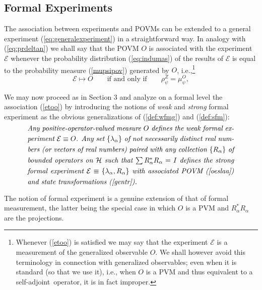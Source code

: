 \documentclass[12pt]{article}
\newcommand{\eq}[1]{(\ref{#1})}
\newcommand{\sa}{self-adjoint}
\renewcommand{\dagger}{\ast}
\newcommand{\id}{I}
\renewcommand{\a}{\alpha}
\newcommand{\la}{\lambda_{\a}}
\renewcommand{\H}{\mbox{$\mathcal{H}$}}
\newcommand{\Aa}{R_{\a}}
\newcommand{\Aad}{R^{\dagger}_{\a}}
\newcommand{\E}{\mbox{$\mathscr{E}$}}
\newcommand{\Ex}{\mbox{$\mathcal{E}$}}
\begin{document}
\subsection{Formal Experiments}\label{secFE}\label{subsec.comfefm}
The association between experiments and POVMs can be extended to a
general experiment (\ref{eq:generalexperiment}) in a straightforward
way.  In analogy with (\ref{eq:prdeltan}) we shall say that the POVM
$O$ is associated with the experiment \E{} whenever the probability
distribution (\ref{eq:indumas}) of the results of \E{} is equal to the
probability measure (\ref{mupsipov}) generated by $O$,
i.e.,\footnote{Whenever (\ref{etoo}) is satisfied we may say that the
   experiment \E{} is a measurement of the generalized observable $O$.
   We shall however avoid this terminology in connection with
   generalized observables; even when it is standard (so that we use
   it), i.e., when $ O$ is a PVM and thus equivalent to a \sa\
   operator, it is in fact improper.}
%
\begin{equation}
\E\mapsto O \qquad\mbox{if and only if}\qquad \rho^{ Z}_{\psi}
=\mu^O_\psi,
\label{etoo}
\end{equation}
%

We may now proceed as in Section 3 and analyze on a formal level the
association (\ref{etoo}) by introducing the notions of \emph{weak} and
\emph{strong} formal experiment as the obvious generalizations of
(\ref{def:wfmg}) and (\ref{def:sfm}):
\begin{equation}
\mbox{%
\begin{minipage}{0.85\textwidth}\openup 1.4\jot
   \setlength{\baselineskip}{12pt}\emph{Any positive-operator-valued
     measure $O$ defines the weak formal experiment $\Ex\equiv O$.  Any
     set $\{\la \}$ of not necessarily distinct real numbers (or
     vectors of real numbers) paired with any collection $\{\Aa\}$ of
     bounded operators on $\H$ such that $\sum\Aa^{\ast}\Aa=\id$
     defines the strong formal experiment $ \Ex\equiv\{\la, \Aa \}$
     with associated POVM \eq{oeslaa} and state transformations
     \eq{gentr}.  }
   \end{minipage}}
\label{def:wfe}
\end{equation}


The notion of formal experiment is a genuine extension of that of
formal measurement, the latter being the special case in which $O$ is
a PVM and $\Aad\Aa$ are the projections.
\end{document}
